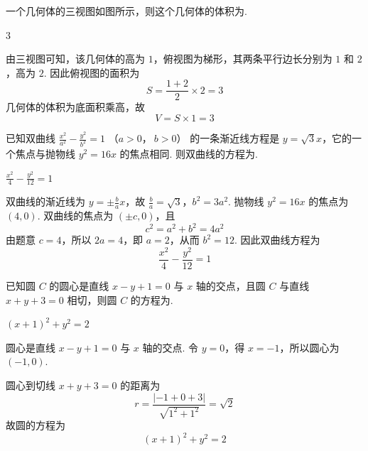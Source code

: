 \begin{problem}
一个几何体的三视图如图所示，则这个几何体的体积为\fillinblank{}.

\end{problem}

\begin{answer}
3
\end{answer}

\begin{solution}
由三视图可知，该几何体的高为 \(1\)，俯视图为梯形，其两条平行边长分别为 \(1\) 和 \(2\)，高为 \(2\). 因此俯视图的面积为
\[
S=\frac{1+2}{2}\times2=3
\]
几何体的体积为底面积乘高，故
\[
V=S\times1=3
\]
\end{solution}

\begin{problem}
已知双曲线 \(\frac{x^2}{a^2} - \frac{y^2}{b^2} = 1\) （\(a > 0\)，\(\ b > 0\)） 的一条渐近线方程是 \(y = \sqrt{3}x\)，它的一个焦点与抛物线 \(y^2 = 16x\) 的焦点相同. 则双曲线的方程为\fillinblank{}.
\end{problem}

\begin{answer}
\(\frac{x^2}{4} - \frac{y^2}{12} = 1\)
\end{answer}

\begin{solution}
双曲线的渐近线为 \(y=\pm\frac{b}{a}x\)，故
\(\frac{b}{a}=\sqrt3\)，\(b^2=3a^2\).
抛物线 \(y^2=16x\) 的焦点为 \((4,0)\). 双曲线的焦点为 \((\pm c,0)\)，且
\[
c^2=a^2+b^2=4a^2
\]
由题意 \(c=4\)，所以 \(2a=4\)，即 \(a=2\)，从而 \(b^2=12\). 因此双曲线方程为
\[
\frac{x^2}{4}-\frac{y^2}{12}=1
\]
\end{solution}

\begin{problem}
已知圆 \(C\) 的圆心是直线 \(x - y + 1 = 0\) 与 \(x\) 轴的交点，且圆 \(C\) 与直线 \(x + y + 3 = 0\) 相切，则圆 \(C\) 的方程为\fillinblank{}.
\end{problem}

\begin{answer}
\((x+1)^2+y^2=2\)
\end{answer}

\begin{solution}
圆心是直线 \(x-y+1=0\) 与 \(x\) 轴的交点. 令 \(y=0\)，得 \(x=-1\)，所以圆心为 \((-1,0)\).

圆心到切线 \(x+y+3=0\) 的距离为
\[
r=\frac{|-1+0+3|}{\sqrt{1^2+1^2}}=\sqrt2
\]
故圆的方程为
\[
(x+1)^2+y^2=2
\]
\end{solution}


